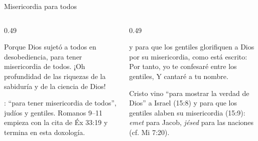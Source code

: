 \begin{frame}{Misericordia para todos}
\begin{columns}[t,onlytextwidth]
\begin{column}{0.49\textwidth}
\begin{cita}Porque Dios sujetó a todos en desobediencia, para tener misericordia de todos. ¡Oh profundidad de las riquezas de la sabiduría y de la ciencia de Dios!\end{cita}
\scriptsize{}: ``para tener misericordia de todos'', judíos y gentiles. Romanos 9--11 empieza con la cita de Éx 33:19 y termina en esta doxología.
\end{column}
\begin{column}{0.49\textwidth}
\begin{cita}y para que los gentiles glorifiquen a Dios por su misericordia, como está escrito: Por tanto, yo te confesaré entre los gentiles, Y cantaré a tu nombre.\end{cita}
\scriptsize Cristo vino ``para mostrar la verdad de Dios'' a Israel (15:8) y para que los gentiles alaben su misericordia (15:9): \emph{emet} para Jacob, \emph{jésed} para las naciones (cf. Mi 7:20).
\end{column}
\end{columns}\par\smallskip
\centering
{}
\end{frame}

